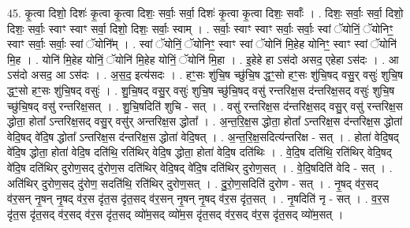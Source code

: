 \documentclass[17pt]{extarticle}
\begin{document}
45. कृ॒त्वा दिशो॒ दिशः॑ कृ॒त्वा कृ॒त्वा दिशः॒ सर्वाः॒ सर्वा॒ दिशः॑ कृ॒त्वा कृ॒त्वा दिशः॒ सर्वाः᳚ । . दिशः॒ सर्वाः॒ सर्वा॒ दिशो॒ दिशः॒ सर्वाः॒ स्वाꣳ स्वाꣳ सर्वा॒ दिशो॒ दिशः॒ सर्वाः॒ स्वाम् । . सर्वाः॒ स्वाꣳ स्वाꣳ सर्वाः॒ सर्वाः॒ स्वां ॅयोनिं॒ ॅयोनिꣳ॒॒ स्वाꣳ सर्वाः॒ सर्वाः॒ स्वां ॅयोनि᳚म् । . स्वां ॅयोनिं॒ ॅयोनिꣳ॒॒ स्वाꣳ स्वां ॅयोनि॑ मि॒हेह योनिꣳ॒॒ स्वाꣳ स्वां ॅयोनि॑ मि॒ह । . योनि॑ मि॒हेह योनिं॒ ॅयोनि॑ मि॒हेह योनिं॒ ॅयोनि॑ मि॒हा । . इ॒हेहे हा ऽस॑दो असद॒ एहेहा ऽस॑दः । . आ ऽस॑दो असद॒ आ ऽस॑दः । . अ॒स॒द॒ इत्य॑सदः । . हꣳ॒॒सः शु॑चि॒ष च्छु॑चि॒ष द्धꣳ॒॒सो हꣳ॒॒सः शु॑चि॒षद् वसु॒र् वसुः॑ शुचि॒ष द्धꣳ॒॒सो हꣳ॒॒सः शु॑चि॒षद् वसुः॑ । . शु॒चि॒षद् वसु॒र् वसुः॑ शुचि॒ष च्छु॑चि॒षद् वसु॑ रन्तरिक्ष॒स द॑न्तरिक्ष॒सद् वसुः॑ शुचि॒ष च्छु॑चि॒षद् वसु॑ रन्तरिक्ष॒सत् । . शु॒चि॒षदिति॑ शुचि - सत् । . वसु॑ रन्तरिक्ष॒स द॑न्तरिक्ष॒सद् वसु॒र् वसु॑ रन्तरिक्ष॒स द्धोता॒ होता᳚ ऽन्तरिक्ष॒सद् वसु॒र् वसु॑र् अन्तरिक्ष॒स द्धोता᳚ । . अ॒न्त॒रि॒क्ष॒स द्धोता॒ होता᳚ ऽन्तरिक्ष॒स द॑न्तरिक्ष॒स द्धोता॑ वेदि॒षद् वे॑दि॒ष द्धोता᳚ ऽन्तरिक्ष॒स द॑न्तरिक्ष॒स द्धोता॑ वेदि॒षत् । . अ॒न्त॒रि॒क्ष॒सदित्य॑न्तरिक्ष - सत् । . होता॑ वेदि॒षद् वे॑दि॒ष द्धोता॒ होता॑ वेदि॒ष दति॑थि॒ रति॑थिर् वेदि॒ष द्धोता॒ होता॑ वेदि॒ष दति॑थिः । . वे॒दि॒ष दति॑थि॒ रति॑थिर् वेदि॒षद् वे॑दि॒ष दति॑थिर् दुरोण॒सद् दु॑रोण॒स दति॑थिर् वेदि॒षद् वे॑दि॒ष दति॑थिर् दुरोण॒सत् । . वे॒दि॒षदिति॑ वेदि - सत् । . अति॑थिर् दुरोण॒सद् दु॑रोण॒ सदति॑थि॒ रति॑थिर् दुरोण॒सत् । . दु॒रो॒ण॒सदिति॑ दुरोण - सत् । . नृ॒षद् व॑र॒सद् व॑र॒सन् नृ॒षन् नृ॒षद् व॑र॒स दृ॑त॒स दृ॑त॒सद् व॑र॒सन् नृ॒षन् नृ॒षद् व॑र॒स दृ॑त॒सत् । . नृ॒षदिति॑ नृ - सत् । . व॒र॒स दृ॑त॒स दृ॑त॒सद् व॑र॒सद् व॑र॒स दृ॑त॒सद् व्यो॑म॒सद् व्यो॑म॒स दृ॑त॒सद् व॑र॒सद् व॑र॒स दृ॑त॒सद् व्यो॑म॒सत् । \newline
\end{document}
